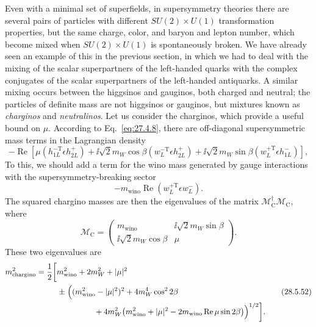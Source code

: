 Even with a minimal set of superfields, in supersymmetry theories there are
several pairs of particles with different \(SU(2)\times U(1)\)
transformation properties, but the same charge, color, and baryon and
lepton number, which become mixed when \(SU(2)\times U(1)\) is
spontaneously broken. We have already seen an example of this in the
previous section, in which we had to deal with the mixing of the scalar
superpartners of the left-handed quarks with the complex conjugates of the
scalar superpartners of the left-handed antiquarks. A similar mixing occurs
between the higgsinos and gauginos, both charged and neutral; the particles
of definite mass are not higgsinos or gauginos, but mixtures known as
\textit{charginos} and \textit{neutralinos}. Let us consider the charginos,
which provide a useful bound on \(\mu\). According to
Eq.~\eqref{eq:27.4.8}, there are off-diagonal supersymmetric mass terms in
the Lagrangian density
\[
  -\operatorname{Re}\left[
    \mu\left(h_{1L}^{-\mathrm T}\epsilon h_{2L}^+\right)
    +\ii\sqrt{2}m_W\cos\beta
      \left(w_L^{-\mathrm T}\epsilon h_{2L}^+\right)
    +\ii\sqrt{2}m_W\sin\beta
      \left(w_L^{+\mathrm T}\epsilon h_{1L}^-\right)
  \right],
\]
To this, we should add a term for the wino mass generated by gauge
interactions with the supersymmetry-breaking sector
\[
  -m_{\mathrm{wino}}\operatorname{Re}
    \left(w_L^{+\mathrm T}\epsilon w_L^-\right).
\]
The squared chargino masses are then the eigenvalues of the matrix
\(\mathcal{M}_{\mathrm C}^\dagger\mathcal{M}_{\mathrm C}\), where
\begin{equation}
  \mathcal{M}_{\mathrm C}
  =
  \begin{pmatrix}
    m_{\mathrm{wino}} & \ii\sqrt{2}m_W\sin\beta\\
    \ii\sqrt{2}m_W\cos\beta & \mu
  \end{pmatrix}.
  \tag{28.5.51}\label{eq:28.5.51}
\end{equation}
These two eigenvalues are
\begin{equation}
  \begin{aligned}
  m_{\mathrm{chargino}}^2
  =\frac12\biggl[
    &m_{\mathrm{wino}}^2+2m_W^2+|\mu|^2\\
    &\mathrel{\pm}\Bigl(
      (m_{\mathrm{wino}}^2-|\mu|^2)^2
      +4m_W^4\cos^22\beta\\
    &\hspace{4.7em}
      +4m_W^2\bigl(
        m_{\mathrm{wino}}^2+|\mu|^2
        -2m_{\mathrm{wino}}\operatorname{Re}\mu\sin2\beta
      \bigr)
    \Bigr)^{1/2}
  \biggr].
  \end{aligned}
  \tag{28.5.52}\label{eq:28.5.52}
\end{equation}
